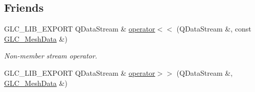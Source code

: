 \subsection*{Friends}
\begin{DoxyCompactItemize}
\item 
G\-L\-C\-\_\-\-L\-I\-B\-\_\-\-E\-X\-P\-O\-R\-T Q\-Data\-Stream \& \hyperlink{class_g_l_c___mesh_data_a3668a972db8b0b6c3e6e9f7c885945a0}{operator$<$$<$} (Q\-Data\-Stream \&, const \hyperlink{class_g_l_c___mesh_data}{G\-L\-C\-\_\-\-Mesh\-Data} \&)
\begin{DoxyCompactList}\small\item\em Non-\/member stream operator. \end{DoxyCompactList}\item 
G\-L\-C\-\_\-\-L\-I\-B\-\_\-\-E\-X\-P\-O\-R\-T Q\-Data\-Stream \& \hyperlink{class_g_l_c___mesh_data_a48f04434d556f2302b439a831311bff5}{operator$>$$>$} (Q\-Data\-Stream \&, \hyperlink{class_g_l_c___mesh_data}{G\-L\-C\-\_\-\-Mesh\-Data} \&)
\end{DoxyCompactItemize}
